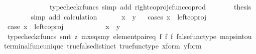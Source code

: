 \begin{isabellebody}
\ \isamarkupfalse%
\ {\isachardoublequoteopen}{\isachardot}{\kern0pt}{\isachardot}{\kern0pt}{\isachardot}{\kern0pt}\ {\isacharequal}{\kern0pt}\ {\isasymlangle}{\isasymf}{\isacharcomma}{\kern0pt}{\isasymt}{\isasymrangle}{\isachardoublequoteclose}\isanewline
\ \ \ \ \ \ \isamarkupfalse%
\ {\isacharparenleft}{\kern0pt}typecheck{\isacharunderscore}{\kern0pt}cfuncs{\isacharcomma}{\kern0pt}\ simp\ add{\isacharcolon}{\kern0pt}\ right{\isacharunderscore}{\kern0pt}coproj{\isacharunderscore}{\kern0pt}cfunc{\isacharunderscore}{\kern0pt}coprod{\isacharparenright}{\kern0pt}\isanewline
\ \ \ \ \isamarkupfalse%
\ \isamarkupfalse%
\ {\isacharquery}{\kern0pt}thesis\isanewline
\ \ \ \ \ \ \isamarkupfalse%
\ {\isacharparenleft}{\kern0pt}simp\ add{\isacharcolon}{\kern0pt}\ calculation{\isacharparenright}{\kern0pt}\isanewline
\ \ \isamarkupfalse%
\isanewline
\ \ \isamarkupfalse%
\ {\isachardoublequoteopen}x\ {\isacharequal}{\kern0pt}\ y{\isachardoublequoteclose}\isanewline
\ \ \isamarkupfalse%
{\isacharparenleft}{\kern0pt}cases\ {\isachardoublequoteopen}x\ {\isacharequal}{\kern0pt}\ left{\isacharunderscore}{\kern0pt}coproj\ {\isasymone}\ {\isacharparenleft}{\kern0pt}{\isasymone}\ {\isasymCoprod}\ {\isasymone}{\isacharparenright}{\kern0pt}{\isachardoublequoteclose}{\isacharparenright}{\kern0pt}\isanewline
\ \ \ \ \isamarkupfalse%
\ case{}{\isacharcolon}{\kern0pt}\ {\isachardoublequoteopen}x\ {\isacharequal}{\kern0pt}\ left{\isacharunderscore}{\kern0pt}coproj\ {\isasymone}\ {\isacharparenleft}{\kern0pt}{\isasymone}\ {\isasymCoprod}\ {\isasymone}{\isacharparenright}{\kern0pt}{\isachardoublequoteclose}\isanewline
\ \ \ \ \isamarkupfalse%
\ \isamarkupfalse%
\ {\isachardoublequoteopen}x\ {\isacharequal}{\kern0pt}\ y{\isachardoublequoteclose}\isanewline
\ \ \ \ \ \ \isamarkupfalse%
\ {\isacharparenleft}{\kern0pt}typecheck{\isacharunderscore}{\kern0pt}cfuncs{\isacharcomma}{\kern0pt}\ smt\ {\isacharparenleft}{\kern0pt}z{}{\isacharparenright}{\kern0pt}\ mx{\isacharunderscore}{\kern0pt}eqs{\isacharunderscore}{\kern0pt}my\ element{\isacharunderscore}{\kern0pt}pair{\isacharunderscore}{\kern0pt}eq\ f{}\ f{}\ f{}\ false{\isacharunderscore}{\kern0pt}func{\isacharunderscore}{\kern0pt}type\ maps{\isacharunderscore}{\kern0pt}into{\isacharunderscore}{\kern0pt}{}u{}\ terminal{\isacharunderscore}{\kern0pt}func{\isacharunderscore}{\kern0pt}unique\ true{\isacharunderscore}{\kern0pt}false{\isacharunderscore}{\kern0pt}distinct\ true{\isacharunderscore}{\kern0pt}func{\isacharunderscore}{\kern0pt}type\ x{\isacharunderscore}{\kern0pt}form\ y{\isacharunderscore}{\kern0pt}form{\isacharparenright}{\kern0pt}\isanewline

\end{isabellebody}

